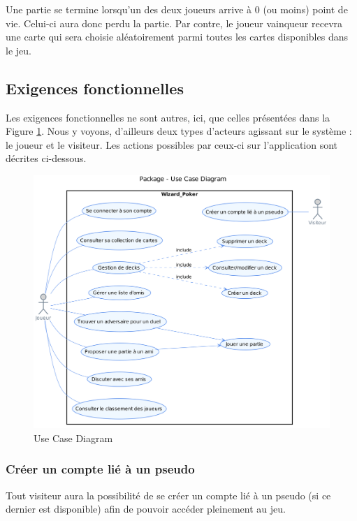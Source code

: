 \documentclass[11pt,a4paper]{article}
\begin{document}
\medbreak

Une partie se termine lorsqu'un des deux joueurs arrive à 0 (ou moins) point de vie.  Celui-ci aura donc perdu la partie.  Par contre, le joueur vainqueur recevra une carte qui sera choisie aléatoirement parmi toutes les cartes disponibles dans le jeu.


\subsection{Exigences fonctionnelles}

Les exigences fonctionnelles ne sont autres, ici, que celles présentées dans la Figure \ref{fig:usecasebesoin}. Nous y voyons, d'ailleurs deux types d'acteurs agissant sur le système : le joueur et le \gls{visiteur}. Les actions possibles par ceux-ci sur l'application sont décrites ci-dessous.

\label{sec:exi-fonc}
\begin{figure}[ht]
  \centering
  \includegraphics[width=1\textwidth]{../uml_files/UseCaseDiagram.png}
  \caption{\label{fig:usecasebesoin} Use Case Diagram}
\end{figure}

\subsubsection*{Créer un compte lié à un pseudo}

Tout visiteur aura la possibilité de se créer un compte
lié à un \gls{pseudo} (si ce dernier est disponible) afin de pouvoir
accéder pleinement au jeu.
\end{document}
